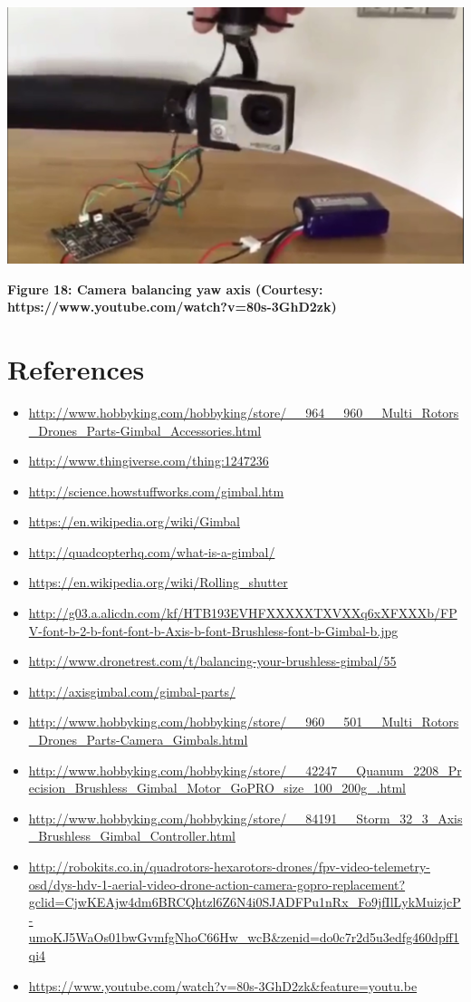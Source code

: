 \documentclass[11pt,a4paper]{article}
\begin{document}
	\begin{center}
		\includegraphics[scale=0.4]{balancing_yaw_axis.jpg}
	\end{center}
	\begin{center}
		\textbf{Figure 18: Camera balancing yaw axis (Courtesy:  https://www.youtube.com/watch?v=80s-3GhD2zk)}
	\end{center}
	\section{References}
	\begin{itemize}
		\item \url{http://www.hobbyking.com/hobbyking/store/__964__960__Multi_Rotors_Drones_Parts-Gimbal_Accessories.html}
		\item \url{http://www.thingiverse.com/thing:1247236}
		\item \url{http://science.howstuffworks.com/gimbal.htm}
		\item \url{https://en.wikipedia.org/wiki/Gimbal}
		\item \url{http://quadcopterhq.com/what-is-a-gimbal/}
		\item \url{https://en.wikipedia.org/wiki/Rolling_shutter}
		\item \url{http://g03.a.alicdn.com/kf/HTB193EVHFXXXXXTXVXXq6xXFXXXb/FPV-font-b-2-b-font-font-b-Axis-b-font-Brushless-font-b-Gimbal-b.jpg}
		\item \url{http://www.dronetrest.com/t/balancing-your-brushless-gimbal/55}
		\item \url{http://axisgimbal.com/gimbal-parts/}
		\item \url{http://www.hobbyking.com/hobbyking/store/__960__501__Multi_Rotors_Drones_Parts-Camera_Gimbals.html}
		\item \url{http://www.hobbyking.com/hobbyking/store/__42247__Quanum_2208_Precision_Brushless_Gimbal_Motor_GoPRO_size_100_200g_.html}
		\item \url{http://www.hobbyking.com/hobbyking/store/__84191__Storm_32_3_Axis_Brushless_Gimbal_Controller.html}
		\item \url{http://robokits.co.in/quadrotors-hexarotors-drones/fpv-video-telemetry-osd/dys-hdv-1-aerial-video-drone-action-camera-gopro-replacement?gclid=CjwKEAjw4dm6BRCQhtzl6Z6N4i0SJADFPu1nRx_Fo9jfIlLykMuizjcP-umoKJ5WaOs01bwGvmfgNhoC66Hw_wcB&zenid=do0c7r2d5u3edfg460dpff1qi4}
		\item \url{https://www.youtube.com/watch?v=80s-3GhD2zk&feature=youtu.be}
	\end{itemize}
\end{document}
